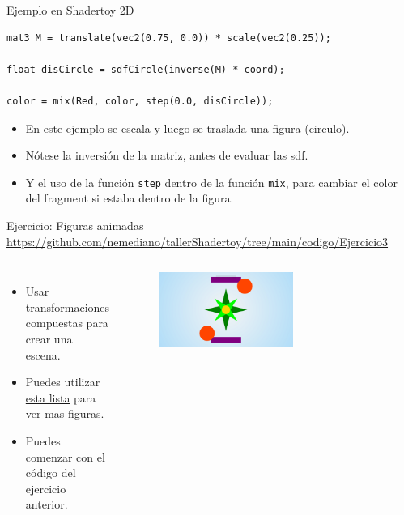 \begin{frame}[fragile]{Ejemplo en Shadertoy 2D}
\begin{listing}
\begin{verbatim}
mat3 M = translate(vec2(0.75, 0.0)) * scale(vec2(0.25));

float disCircle = sdfCircle(inverse(M) * coord);

color = mix(Red, color, step(0.0, disCircle));
\end{verbatim}
\end{listing}
\begin{itemize}
    \item En este ejemplo se escala y luego se traslada una figura (circulo).
    \item Nótese la inversión de la matriz, antes de evaluar las sdf.
    \item Y el uso de la función \texttt{step} dentro de la función \texttt{mix}, para cambiar el color del fragment si estaba dentro de la figura.
\end{itemize}
\end{frame}

\begin{frame}{Ejercicio: Figuras animadas}
\url{https://github.com/nemediano/tallerShadertoy/tree/main/codigo/Ejercicio3}
\begin{columns}
     \begin{itemize}
         \item Usar transformaciones compuestas para crear una escena.
         \item Puedes utilizar \href{https://iquilezles.org/articles/distfunctions2d/}{esta lista} para ver mas figuras.
         \item Puedes comenzar con el código del ejercicio anterior.
     \end{itemize}
        \begin{figure}[htb]
            \centering
            \includegraphics[width=0.6\textwidth]{img/Ejer/Ejer3}
        \end{figure}
\end{columns}
\end{frame}
